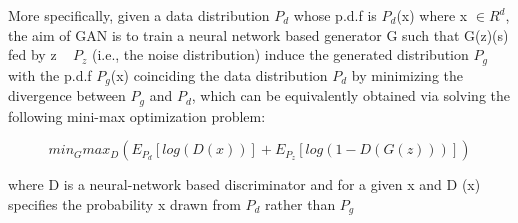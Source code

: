 More specifically, given a data distribution $P_d$ whose p.d.f is $P_d$(x) where x $ \in R^d$, the aim of GAN is to train a neural network based generator G such that G(z)(s) fed by z ~ $P_z$ (i.e., the noise distribution) induce the generated distribution $P_g$ with the p.d.f $P_g$(x) coinciding the data distribution $P_d$ by minimizing the divergence between $P_g$ and $P_d$, which can be equivalently obtained via solving the following mini-max optimization problem:

$$min_Gmax_D (E_{P_d}[log(D(x))] + E_{P_z}[log (1 - D (G (z)))])$$

\noindent
where D is a neural-network based discriminator and for a given x and D (x) specifies the
probability x drawn from $P_d$ rather than $P_g$